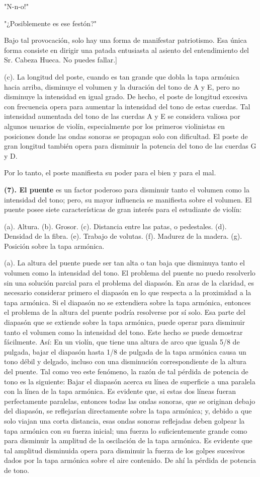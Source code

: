 \documentclass[12pt]{book}
\begin{document}
"N-n-o!"

"¿Posiblemente es ese festón?"

Bajo tal provocación, solo hay una forma de manifestar patriotismo. Esa única forma consiste en dirigir una patada entusiasta al asiento del entendimiento del Sr. Cabeza Hueca. No puedes fallar.]

(c). La longitud del poste, cuando es tan grande que dobla la tapa armónica hacia arriba, disminuye el volumen y la duración del tono de A y E, pero no disminuye la intensidad en igual grado. De hecho, el poste de longitud excesiva con frecuencia opera para aumentar la intensidad del tono de estas cuerdas. Tal intensidad aumentada del tono de las cuerdas A y E se considera valiosa por algunos usuarios de violín, especialmente por los primeros violinistas en posiciones donde las ondas sonoras se propagan solo con dificultad. El poste de gran longitud también opera para disminuir la potencia del tono de las cuerdas G y D.

Por lo tanto, el poste manifiesta su poder para el bien y para el mal.

\textbf{(7). El puente} es un factor poderoso para disminuir tanto el volumen como la intensidad del tono; pero, su mayor influencia se manifiesta sobre el volumen. El puente posee siete características de gran interés para el estudiante de violín:

(a). Altura. (b). Grosor. (c). Distancia entre las patas, o pedestales. (d). Densidad de la fibra. (e). Trabajo de volutas. (f). Madurez de la madera. (g). Posición sobre la tapa armónica.

(a). La altura del puente puede ser tan alta o tan baja que disminuya tanto el volumen como la intensidad del tono. El problema del puente no puedo resolverlo sin una solución parcial para el problema del diapasón. En aras de la claridad, es necesario considerar primero el diapasón en lo que respecta a la proximidad a la tapa armónica. Si el diapasón no se extendiera sobre la tapa armónica, entonces el problema de la altura del puente podría resolverse por sí solo. Esa parte del diapasón que se extiende sobre la tapa armónica, puede operar para disminuir tanto el volumen como la intensidad del tono. Este hecho se puede demostrar fácilmente. Así: En un violín, que tiene una altura de arco que iguala 5/8 de pulgada, bajar el diapasón hasta 1/8 de pulgada de la tapa armónica causa un tono débil y delgado, incluso con una disminución correspondiente de la altura del puente. Tal como veo este fenómeno, la razón de tal pérdida de potencia de tono es la siguiente: Bajar el diapasón acerca su línea de superficie a una paralela con la línea de la tapa armónica. Es evidente que, si estas dos líneas fueran perfectamente paralelas, entonces todas las ondas sonoras, que se originan debajo del diapasón, se reflejarían directamente sobre la tapa armónica; y, debido a que solo viajan una corta distancia, esas ondas sonoras reflejadas deben golpear la tapa armónica con su fuerza inicial; una fuerza lo suficientemente grande como para disminuir la amplitud de la oscilación de la tapa armónica. Es evidente que tal amplitud disminuida opera para disminuir la fuerza de los golpes sucesivos dados por la tapa armónica sobre el aire contenido. De ahí la pérdida de potencia de tono.
\end{document}
